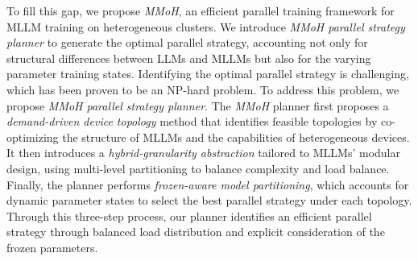 \documentclass[conference]{IEEEtran}
\begin{document}
To fill this gap, we propose \textit{MMoH}, an efficient parallel training framework for MLLM training on heterogeneous clusters.
We introduce \textit{MMoH parallel strategy planner} to generate the optimal parallel strategy, accounting not only for structural differences between LLMs and MLLMs but also for the varying parameter training states.
Identifying the optimal parallel strategy is challenging, which has been proven to be an NP-hard problem\cite{benoit2008mapping}.
To address this problem, we propose \textit{MMoH parallel strategy planner}.
The \textit{MMoH} planner first proposes a \textit{demand-driven device topology} method that identifies feasible topologies by co-optimizing the structure of MLLMs and the capabilities of heterogeneous devices.
It then introduces a \textit{hybrid-granularity abstraction} tailored to MLLMs' modular design, using multi-level partitioning to balance complexity and load balance.
Finally, the planner performs \textit{frozen-aware model partitioning}, which accounts for dynamic parameter states to select the best parallel strategy under each topology.
Through this three-step process, our planner identifies an efficient parallel strategy through balanced load distribution and explicit consideration of the frozen parameters.
\end{document}
